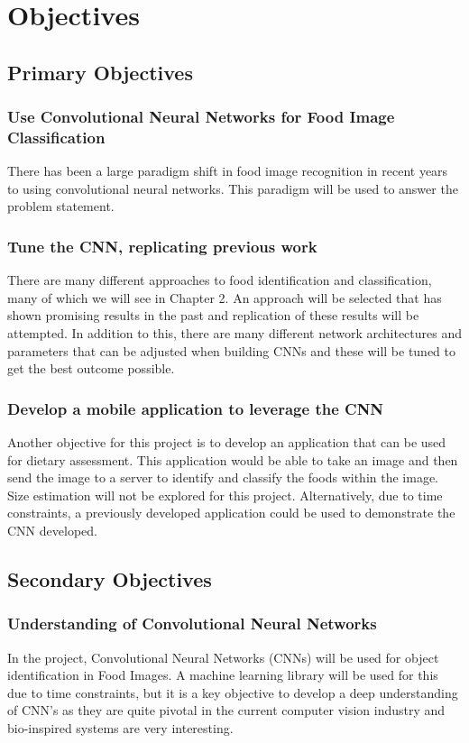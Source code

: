 \section{Objectives}
\tocless\subsection{Primary Objectives}
\tocless\subsubsection{Use Convolutional Neural Networks for Food Image Classification}
There has been a large paradigm shift in food image recognition in recent years to using convolutional neural networks. This paradigm will be used to answer the problem statement.

\tocless\subsubsection{Tune the CNN, replicating previous work}
There are many different approaches to food identification and classification,
many of which we will see in Chapter 2. An approach will be selected that has
shown promising results in the past and replication of these results will be attempted. In addition to this, there are many different network architectures and parameters that can be adjusted when building CNNs and these will be tuned to get the best outcome possible.

\tocless\subsubsection{Develop a mobile application to leverage the CNN}
Another objective for this project is to develop an application that can be used
for dietary assessment. This application would be able to take an image and then send the image to a server to identify and classify the foods within the image. Size estimation will not be explored for this project. Alternatively, due to time constraints, a previously developed application could be used to demonstrate the CNN developed.

\tocless\subsection{Secondary Objectives}
\tocless\subsubsection{Understanding of Convolutional Neural Networks}
In the project, Convolutional Neural Networks (CNNs) will be used for object identification in Food Images.
A machine learning library will be used for this due to time constraints, but it is a key
objective to develop a deep understanding of CNN's as they are quite pivotal in the current computer vision industry and bio-inspired systems are very interesting.

